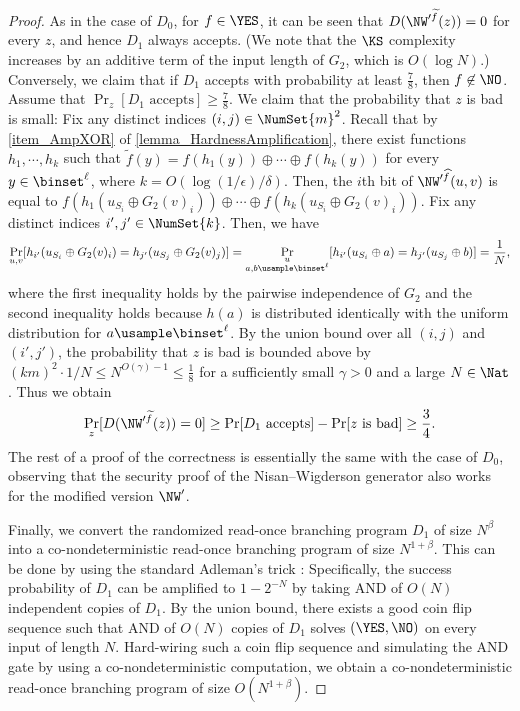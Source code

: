 \documentclass{toc}
\begin{document}
\begin{proof}
  As in the case of $D_0$, for $f \in \YES$, it can be seen that $D(\NW'^{\widetilde{f}}(z)) = 0$ for every $z$, and hence $D_1$ always accepts.
  (We note that the $\KS$ complexity increases by an additive term of the input length of $G_2$, which is $O(\log N)$.)
  Conversely, we claim that if $D_1$ accepts with probability at least $\frac{7}{8}$, then $f \not\in \NO$.
  Assume that $\Pr_{z} [ \text{$D_1$ accepts} ] \ge \frac{7}{8}$.
  We claim that the probability that $z$ is bad is small:
  Fix any distinct indices $(i, j) \in \NumSet{m}^2$.
  Recall that by \cref{item_AmpXOR} of \cref{lemma_HardnessAmplification},
  there exist functions $h_1, \cdots, h_k$ such that
  $
    \widetilde{f}(y) =
    f(h_1(y)) \oplus \cdots \oplus f(h_k(y))$
  for every $y \in \binset^\ell$,
  where $k = O(\log(1/\epsilon) / \delta)$.
  Then, the $i$th bit of $\NW'^{\widehat{f}}(u, v)$ is equal to
  $f(h_1(u_{S_i} \oplus G_2(v)_i))
    \oplus \cdots \oplus f(h_k(u_{S_i} \oplus G_2(v)_i)).
  $
  Fix any distinct indices $i', j' \in \NumSet{k}$.
  Then, we have
  \begin{align*}
    \Pr_{u, v}[h_{i'}(u_{S_i} \oplus G_2(v)_i)
      = h_{j'}(u_{S_j} \oplus G_2(v)_j)]
    = \Pr_{\substack{u \\ a, b \usample \binset^\ell}}[h_{i'}(u_{S_i} \oplus a) = h_{j'}(u_{S_j} \oplus b)]
    = \frac{1}{N},
  \end{align*}
  where the first inequality holds by the pairwise independence of $G_2$
  and the second inequality holds because $h(a)$ is distributed identically with the uniform distribution for $a \usample \binset^\ell$.
  By the union bound over all $(i, j)$ and $(i', j')$,
  the probability that $z$ is bad is bounded above by $(km)^2 \cdot 1/N \le N^{O(\gamma) - 1} \le \frac{1}{8}$ for a sufficiently small $\gamma > 0$ and a large $N \in \Nat$.
  Thus we obtain
  \begin{align*}
    \Pr_z [ D(\NW'^{\widetilde{f}}(z)) = 0 ]
    \ge
    \Pr [ \text{$D_1$ accepts} ] - \Pr [ \text{$z$ is bad} ] \ge \frac{3}{4}.
  \end{align*}
  The rest of a proof of the correctness is essentially the same with the case of $D_0$,
  observing that the security proof of the Nisan--Wigderson generator also works for the modified version $\NW'$.

  Finally, we convert the randomized read-once branching program $D_1$ of size $N^\beta$
  into a co-nondeterministic read-once branching program of size $N^{1 + \beta}$.
  This can be done by using the standard Adleman's trick \cite{Adleman78_focs_conf}:
  Specifically, the success probability of $D_1$ can be amplified to $1 - 2^{-N}$ by taking AND of $O(N)$ independent copies of $D_1$.
  By the union bound, there exists a good coin flip sequence such that
  AND of $O(N)$ copies of $D_1$ solves $(\YES, \NO)$ on every input of length $N$.
  Hard-wiring such a coin flip sequence and simulating the AND gate by using a co-nondeterministic computation,
  we obtain a co-nondeterministic read-once branching program of size $O(N^{1 + \beta})$.
\end{proof}
\end{document}
